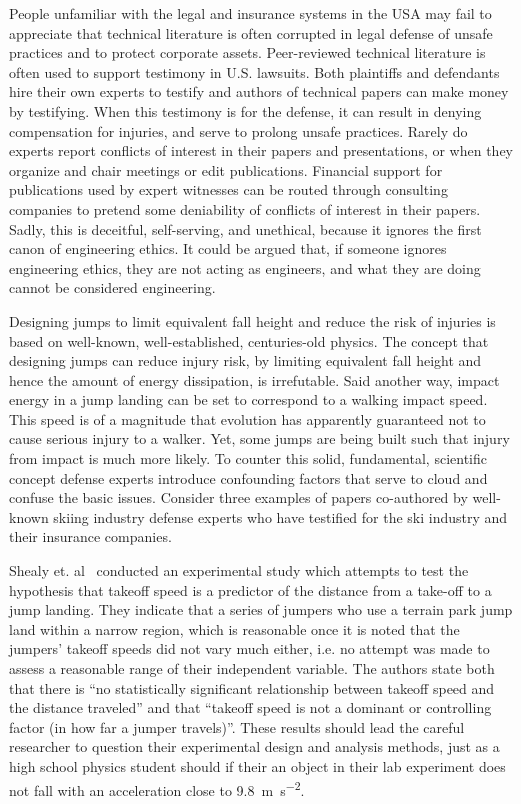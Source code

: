 \documentclass{article}
\begin{document}
People unfamiliar with the legal and insurance systems in the USA may fail to
appreciate that technical literature is often corrupted in legal defense of
unsafe practices and to protect corporate assets. Peer-reviewed technical
literature is often used to support testimony in U.S. lawsuits. Both plaintiffs and
defendants hire their own experts to testify and authors of technical papers
can make money by testifying. When this testimony is for the defense, it 
can result in denying compensation for injuries, and serve to prolong
unsafe practices. Rarely do experts report conflicts of interest in their
papers and presentations, or when they organize and chair meetings or edit
publications. Financial support for publications used by expert witnesses can
be routed through consulting companies to pretend some deniability of conflicts
of interest in their papers. Sadly, this is deceitful, self-serving, and
unethical, because it ignores the first canon of engineering ethics. It could
be argued that, if someone ignores engineering ethics, they are not acting as
engineers, and what they are doing cannot be considered engineering.

Designing jumps to limit equivalent fall height and reduce the risk of injuries
is based on well-known, well-established, centuries-old physics. The concept
that designing jumps can reduce injury risk, by limiting equivalent fall height and hence the amount of energy dissipation, is irrefutable. Said another way, impact
energy in a jump landing can be set to correspond to a walking impact speed. This speed is of a magnitude that evolution has apparently guaranteed not to cause serious injury to a walker. Yet, some jumps are being built such that injury from impact is much
more likely. To counter this solid, fundamental, scientific concept defense
experts introduce confounding factors that serve to cloud and confuse the
basic issues.  Consider three examples of papers co-authored by well-known
skiing industry defense experts who have testified for the ski industry and
their insurance companies.

Shealy et. al~\cite{Shealy2010} conducted an experimental study which attempts
to test the hypothesis that takeoff speed is a predictor of the distance from a
take-off to a jump landing. They indicate that a series of jumpers who use a
terrain park jump land within a narrow region, which is reasonable once it is
noted that the jumpers' takeoff speeds did not vary much either, i.e. no
attempt was made to assess a reasonable range of their independent variable.
The authors state both that there is ``no statistically significant
relationship between takeoff speed and the distance traveled'' and that
``takeoff speed is not a dominant or controlling factor (in how far a jumper
travels)''. These results should lead the careful researcher to question their
experimental design and analysis methods, just as a high school physics student
should if their an object in their lab experiment does not fall with an
acceleration close to 9.8~\si{\meter\per\second\squared}.
\end{document}
